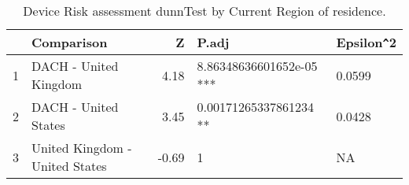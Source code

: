 \begin{table}[ht]
\centering
\begin{tabular}{rlrll}
  \hline
 & Comparison & Z & P.adj & Epsilon\verb|^|2 \\ 
  \hline
1 & DACH - United Kingdom & 4.18 & 8.86348636601652e-05 *** & 0.0599 \\ 
  2 & DACH - United States & 3.45 & 0.00171265337861234 ** & 0.0428 \\ 
  3 & United Kingdom - United States & -0.69 & 1   & NA \\ 
   \hline
\end{tabular}
\caption{Device Risk assessment dunnTest by Current Region of residence.} 
\label{RQ2_H3_RiskPerceptionRegionSmartTV}
\end{table}
